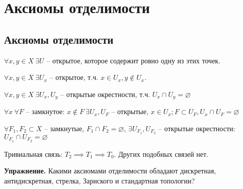 \documentclass[main]{subfiles}
\begin{document}
\chapter{Аксиомы отделимости}
\section{Аксиомы отделимости}
\begin{theorem}
    $\forall x, y \in X\ \exists U$ -- открытое, которое  содержит ровно одну из этих точек.
\end{theorem}
\begin{theorem}
    $\forall x, y \in X\ \exists U_x$ -- открытое, т.ч. $x\in U_x, y \not\in U_x$.
\end{theorem}
\begin{theorem}
    $\forall x,y \in X\ \exists U_x, U_y$ -- открытые окрестности, т.ч. $U_x \cap U_y = \varnothing$
\end{theorem}
\begin{theorem}[$T_3$]
    $\forall x\ \forall F$ -- замкнутое: $x \not\in F\ \exists U_x, U_F$ -- открытые,
    $x \in U_x; F \subset U_F, U_x \cap U_F = \varnothing$
\end{theorem}
\begin{theorem}[$T_4$]
    $\forall F_1, F_2 \subset X$ -- замкнутые, $F_1 \cap F_2 = \varnothing$,
    $\exists U_{F_1}, U_{F_2}$ -- открытые окрестности: $U_{F_1} \cap U_{F_2} = \varnothing$
\end{theorem}

Тривиальная связь: $T_2 \implies T_1 \implies T_0$.
Других подобных связей нет.

\textbf{Упражнение.} Какими аксиомами отделимости обладают дискретная, антидискретная, стрелка, Зариского и стандартная топологии?
\end{document}
